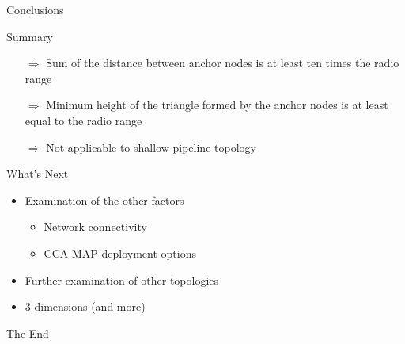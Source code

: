 \documentclass{beamer}
\begin{document}
\begin{frame}{Conclusions}
\begin{block}{Summary}
	\begin{itemize}
		\item[$\Rightarrow$] Sum of the distance between anchor nodes is at least ten times the radio range
		\item[$\Rightarrow$] Minimum height of the triangle formed by the anchor nodes is at least equal to the radio range
		\item[$\Rightarrow$] Not applicable to shallow pipeline topology
	\end{itemize}
\end{block}
\begin{block}{What's Next}
	\begin{itemize}
		\item Examination of the other factors
			\begin{itemize}
				\item Network connectivity
				\item CCA-MAP deployment options
			\end{itemize}
		\item Further examination of other topologies
		\item 3 dimensions (and more)
	\end{itemize}
\end{block}	
\end{frame}

\begin{frame}
\centerline{The End}
\end{frame}
\end{document}
